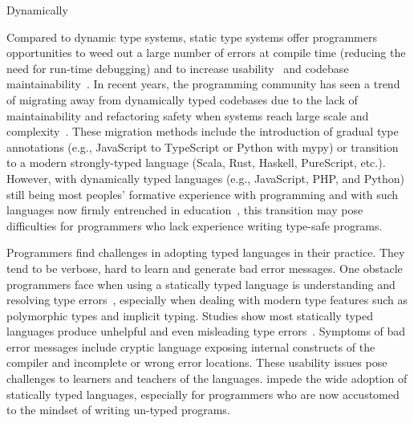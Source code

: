 


Dynamically 

Compared to dynamic type systems, static type systems offer programmers opportunities to weed out a large number of errors at compile time (reducing the need for run-time debugging) and to increase usability~\cite{mayer_static_2012} and codebase maintainability~\cite{kleinschmager_static_2012}. In recent years, the programming community has seen a trend of migrating away from dynamically typed codebases due to the lack of maintainability and refactoring safety when systems reach large scale and complexity~\cite{chatley_next_2019}. These migration methods include the introduction of gradual type annotations (e.g., JavaScript to TypeScript or Python with mypy) or transition to a modern strongly-typed language (Scala, Rust, Haskell, PureScript, etc.). However, with dynamically typed languages (e.g., JavaScript, PHP, and Python) still being most peoples' formative experience with programming and with such languages now firmly entrenched in education~\cite{stackoverflow_stack_2022}, this transition may pose difficulties for programmers who lack experience writing type-safe programs.

Programmers find challenges in adopting typed languages in their practice. They tend to be verbose, hard to learn and generate bad error messages. 
One obstacle programmers face when using a statically typed language is understanding and resolving type errors~\cite{marceau_measuring_2011, tirronen_understanding_2015}, especially when dealing with modern type features such as polymorphic types and implicit typing. Studies show most statically typed languages produce unhelpful and even misleading type errors~\cite{}. Symptoms of bad error messages include cryptic language exposing internal constructs of the compiler and incomplete or wrong error locations. These usability issues pose challenges to learners and teachers of the languages. impede the wide adoption of statically typed languages, especially for programmers who are now accustomed to the mindset of writing un-typed programs.

